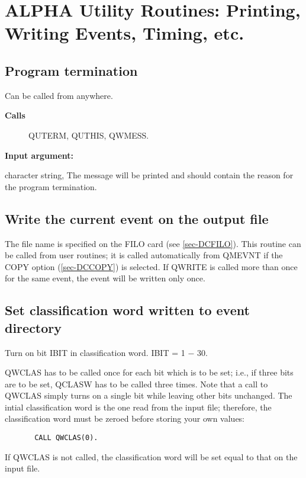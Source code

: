 \chapter{\label{sec-OAR}ALPHA Utility Routines: Printing, Writing
Events, Timing, etc.}
\par
\section{\label{sec-QMT}Program termination}
\par
{}
\par
\par
Can be called from anywhere.
\begin{description}\item[\bf{Calls}]QUTERM, QUTHIS, QWMESS.\end{description}
\par
{\bf Input argument:}
\begin{indentlist}{ 3.50cm}{ 3.75cm}
character string,
The message will be printed and should contain the
reason for the program termination.
\end{indentlist}
\section{\label{sec-QWR}Write the current event on the output file}
\par
{}
\par
\par
The file name is specified on the FILO card (see
\ref{sec-DCFILO}). This routine can be called from user routines;
it is
called automatically from QMEVNT
if the COPY option (\ref{sec-DCCOPY}) is selected.
If QWRITE is called more than once for the same event, the event will
be written only once.
 
\section{\label{sec-QWCLAS}Set classification word written to event
directory}
\par
{}
\par
\par
\begin{indentlist}{ 2.50cm}{ 2.75cm}
Turn on bit IBIT in classification word. IBIT = 1 $-$ 30.
\end{indentlist}
QWCLAS has to
be called once for each bit which is to be set; i.e.,
if three bits are to be set, QCLASW has to be
called three times.
Note that a call to QWCLAS simply turns on a single
bit while leaving other bits unchanged.  The intial classification
word is the one read from the input file;  therefore,
the classification word must be zeroed before storing your
own values:
\begin{verbatim}
       CALL QWCLAS(0).
\end{verbatim}
If QWCLAS is not called, the classification
word will be set equal to that on the input file.
\par
